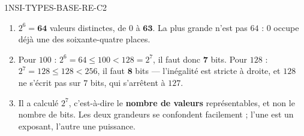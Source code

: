 \begin{corrige}{1NSI-TYPES-BASE-RE-C2}
\begin{enumerate}
  \item $2^6 = \mathbf{64}$ valeurs distinctes, de $0$ à $\mathbf{63}$. La plus grande n'est
        pas $64$ : $0$ occupe déjà une des soixante-quatre places.
  \item Pour $100$ : $2^6 = 64 \leq 100 < 128 = 2^7$, il faut donc $\mathbf{7}$ bits.
        Pour $128$ : $2^7 = 128 \leq 128 < 256$, il faut $\mathbf{8}$ bits — l'inégalité est
        stricte à droite, et $128$ ne s'écrit pas sur $7$ bits, qui s'arrêtent à $127$.
  \item Il a calculé $2^7$, c'est-à-dire le \textbf{nombre de valeurs} représentables, et non
        le nombre de bits. Les deux grandeurs se confondent facilement ; l'une est un exposant,
        l'autre une puissance.
\end{enumerate}
\end{corrige}
